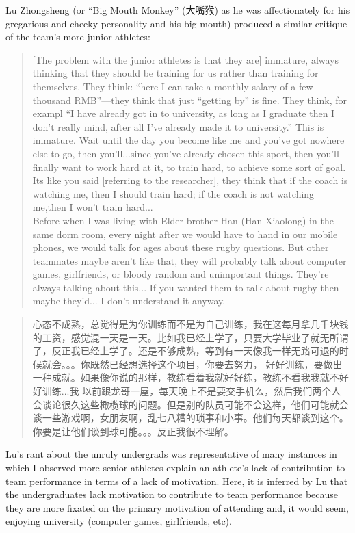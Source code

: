 \begin{CJK}{UTF8}{gbsn}
Lu Zhongsheng (or ``Big Mouth Monkey'' (大嘴猴) as he was affectionately for his gregarious and cheeky personality and his big mouth) produced a similar critique of the team's more junior athletes:

      \begin{quote}
        [The problem with the junior athletes is that they are] immature, always thinking that they should be training for us rather than training for themselves.  They think: ``here I can take a monthly salary of a few thousand RMB''---they think that just ``getting by'' is fine.  They think, for exampl  ``I have already got in to university, as long as I graduate then I don't really mind, after all I've already made it to university.''  This is immature.  Wait until the day you become like me and you've got nowhere else to go, then you'll...since you've already chosen this sport, then you'll finally want to work hard at it, to train hard, to achieve some sort of goal.  Its like you said [referring to the researcher], they think that if the coach is watching me, then I should train hard; if the coach is not watching me,then I won't train hard...\\

        Before when I was living with Elder brother Han (Han Xiaolong) in the same dorm room, every night after we would have to hand in our mobile phones, we would talk for ages about these rugby questions. But other teammates maybe aren't like that, they will probably talk about computer games, girlfriends, or bloody random and unimportant things.  They're always talking about this... If you wanted them to talk about rugby then maybe they'd... I don't understand it anyway.
      \end{quote}

      \begin{quote}
        心态不成熟，总觉得是为你训练而不是为自己训练，我在这每月拿几千块钱的工资，感觉混一天是一天。比如我已经上学了，只要大学毕业了就无所谓了，反正我已经上学了。还是不够成熟，等到有一天像我一样无路可退的时候就会。。。你既然已经想选择这个项目，你要去努力， 好好训练，要做出一种成就。如果像你说的那样，教练看着我就好好练，教练不看我我就不好好训练...我
    以前跟龙哥一屋，每天晚上不是要交手机么，然后我们两个人会谈论很久这些橄榄球的问题。但是别的队员可能不会这样，他们可能就会谈一些游戏啊，女朋友啊，乱七八糟的琐事和小事。他们每天都谈到这个。你要是让他们谈到球可能。。。反正我很不理解。
      \end{quote}

Lu's rant about the unruly undergrads was representative of many instances in which I observed more senior athletes explain an athlete's lack of contribution to team performance in terms of a lack of motivation. Here, it is inferred by Lu that the undergraduates lack motivation to contribute to team performance because they are more fixated on the primary motivation of attending and, it would seem, enjoying university (computer games, girlfriends, etc).


\end{CJK}
